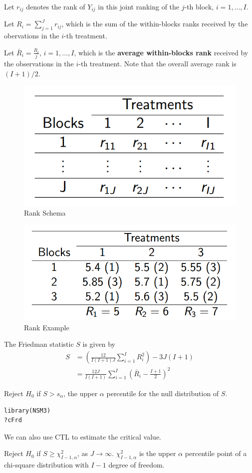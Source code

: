 Let $r_{ij}$ denotes the rank of $Y_{ij}$ in this joint ranking of the $j$-th block, $i = 1, \dots, I$.

Let $R_i = \sum_{j=1}^{J} r_{ij}$, which is the sum of the within-blocks ranks received by the obervations in the $i$-th treatment.

Let $\bar{R}_i = \frac{R_i}{j}$, $i = 1, \dots, I$, which is the \textbf{average within-blocks rank} received by the observations in the $i$-th treatment. Note that the overall average rank is $(I + 1) / 2$.

\begin{figure}[H]
	\centering
	\includegraphics[width=0.45\linewidth]{fig/rank-schema}
	\caption{Rank Schema}
	\label{fig:rank-schema}
\end{figure}
\begin{figure}[H]
	\centering
	\includegraphics[width=0.45\linewidth]{fig/rank-example}
	\caption{Rank Example}
	\label{fig:rank-example}
\end{figure}

The Friedman statistic $S$ is given by 
\begin{align}
	S 
	&= (\frac{12}{I(I + 1)J} \sum_{i=1}^{I} R_i^2) - 3J(I+1)\\
	&= \frac{12J}{I(I+1)}\sum_{i=1}^{I} (\bar{R}_i - \frac{I + 1}{2})^2
\end{align}

Reject $H_0$ if $S > s_\alpha$, the upper $\alpha$ percentile for the null distribution of $S$.

\begin{lstlisting}[language=Python]
library(NSM3)
?cFrd
\end{lstlisting}

We can also use CTL to estimate the critical value.

Reject $H_0$ if $S \ge \chi_{I - 1,\alpha}^2$, as $J \rightarrow \infty$. $\chi_{I - 1,\alpha}^2$ is the upper $\alpha$ percentile point of a chi-square distribution with $I-1$ degree of freedom.

